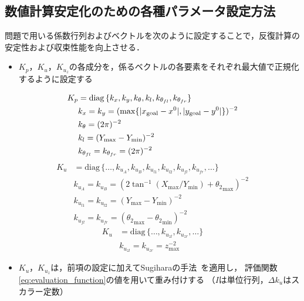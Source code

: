 \documentclass[autodetect-engine,dvipdfmx-if-dvi,ja=standard,a4j,jbase=11pt,magstyle=nomag*]{bxjsreport}
\begin{document}
\subsection{数値計算安定化のための各種パラメータ設定方法}
問題で用いる係数行列およびベクトルを次のように設定することで，反復計算の安定性および収束性能を向上させる．
\begin{itemize}
    \item   $K_p$，$K_u$，$K_{u_z}$の各成分を，係るベクトルの各要素をそれぞれ最大値で正規化するように設定する
\end{itemize}
\begin{equation} \label{eq:Kp_setting}
    \begin{aligned}
        K_p & = \mathrm{diag} \, \{ k_x , k_y , k_{\theta} , k_l , k_{\theta_{fl}} , k_{\theta_{fr}} \} \\
        & k_x = k_y = ( \max \{ | x_{\mathrm{goal}} - x^0 | , | y_{\mathrm{goal}} - y^0 | \} )^{-2} \\
        & k_{\theta} = ( 2 \pi )^{-2} \\
        & k_l = ( Y_{\mathrm{max}} - Y_{\mathrm{min}} )^{-2} \\
        & k_{\theta_{fl}} = k_{\theta_{fr}} = ( 2 \pi )^{-2}
    \end{aligned}
\end{equation}
\begin{equation} \label{eq:Ku_setting}
    \begin{aligned}
        K_u & = \mathrm{diag} \, \{ \dots , k_{u_A} , k_{u_B} , k_{u_{l1}} , k_{u_{l2}} , k_{u_{fl}} , k_{u_{fr}} , \dots \} \\
        & k_{u_A} = k_{u_B} = ( 2 \tan^{-1} ( X_{\mathrm{max}} / Y_{\mathrm{min}} ) + {\theta_2}_{\mathrm{max}} )^{-2} \\
        & k_{u_{l1}} = k_{u_{l2}} = ( Y_{\mathrm{max}} - Y_{\mathrm{min}} )^{-2} \\
        & k_{u_{fl}} = k_{u_{fr}} = ( {\theta_2}_{\mathrm{max}} - {\theta_2}_{\mathrm{min}} )^{-2}
    \end{aligned}
\end{equation}
\begin{equation} \label{eq:Kuz_setting}
    \begin{aligned}
        K_u & = \mathrm{diag} \, \{ \dots , k_{u_{zl}} , k_{u_{zr}} , \dots \} \\
        & k_{u_{zl}} = k_{u_{zr}} = z_{\mathrm{max}}^{-2}
    \end{aligned}
\end{equation}
\begin{itemize}
    \item   $K_u$，$K_{u_z}$は，前項の設定に加えてSugiharaの手法~\cite{sugihara_2011tro}を適用し，
            評価関数\cref{eq:evaluation_function}の値を用いて重み付けする
            （$I$は単位行列，$\Delta k_u$はスカラー定数）
\end{itemize}
\end{document}

